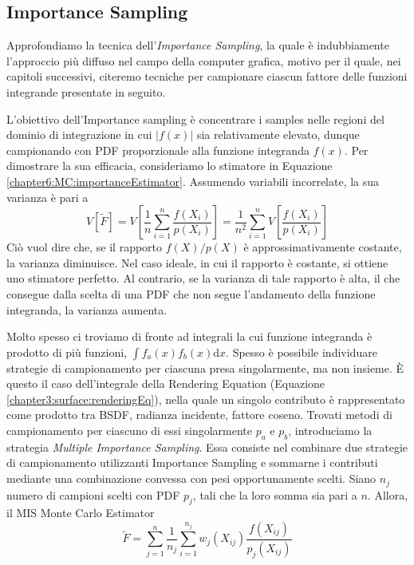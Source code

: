 \subsection{Importance Sampling}\label{chapter6:variance:importanceSampling}
Approfondiamo la tecnica dell'\textit{Importance Sampling}, la quale \`e indubbiamente l'approccio pi\`u diffuso nel campo della computer grafica, 
motivo per il quale, nei capitoli successivi, citeremo tecniche per campionare ciascun fattore delle funzioni integrande presentate in seguito.\par
L'obiettivo dell'Importance sampling \`e concentrare i samples nelle regioni del dominio di integrazione in cui $|f(x)|$ sia relativamente elevato, 
dunque campionando con PDF proporzionale alla funzione integranda $f(x)$. Per dimostrare la sua efficacia, consideriamo lo stimatore in 
Equazione \ref{chapter6:MC:importanceEstimator}. Assumendo variabili incorrelate, la sua varianza \`e pari a
\begin{equation}
	V[\tilde{F}]=V\left[\frac{1}{n}\sum_{i=1}^n\frac{f(X_i)}{p(X_i)}\right]=\frac{1}{n^2}\sum_{i=1}^nV\left[\frac{f(X_i)}{p(X_i)}\right]
\end{equation}
Ci\`o vuol dire che, se il rapporto $f(X)/p(X)$ \`e approssimativamente costante, la varianza diminuisce. Nel caso ideale, in cui il rapporto \`e 
costante, si ottiene uno stimatore perfetto. Al contrario, se la varianza di tale rapporto \`e alta, il che consegue dalla scelta di una PDF che 
non segue l'andamento della funzione integranda, la varianza aumenta.\par
Molto spesso ci troviamo di fronte ad integrali la cui funzione integranda \`e prodotto di pi\`u funzioni, $\int f_a(x)f_b(x)\mathrm{d}x$. Spesso
\`e possibile individuare strategie di campionamento per ciascuna presa singolarmente, ma non insieme. \`E questo il caso dell'integrale della 
Rendering Equation (Equazione \ref{chapter3:surface:renderingEq}), nella quale un singolo contributo \`e rappresentato come prodotto tra BSDF, 
radianza incidente, fattore coseno. Trovati metodi di campionamento per ciascuno di essi singolarmente $p_a$ e $p_b$, introduciamo la strategia
\textit{Multiple Importance Sampling}. Essa consiste nel combinare due strategie di campionamento utilizzanti Importance Sampling e sommarne i 
contributi mediante una combinazione convessa con pesi opportunamente scelti. Siano $n_j$ numero di campioni scelti con PDF $p_j$, tali che la loro
somma sia pari a $n$. Allora, il MIS Monte Carlo Estimator
\begin{equation}\label{chapter6:variance:MISMC}
	\tilde{F}=\sum_{j=1}^n\frac{1}{n_j}\sum_{i=1}^{n_j}w_j(X_{ij})\frac{f(X_{ij})}{p_j(X_{ij})}
\end{equation}
